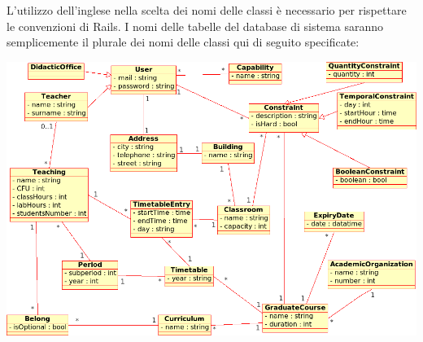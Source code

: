 \documentclass[11pt,a4paper]{article}
\begin{document}
L'utilizzo dell'inglese nella scelta dei nomi delle classi è necessario per rispettare le convenzioni di Rails.
I nomi delle tabelle del database di sistema saranno semplicemente il plurale dei nomi delle classi qui di seguito specificate:
\\
\begin{center}
\includegraphics[scale=0.33]{images/class_diagram.png}
\end{center}
\end{document}
